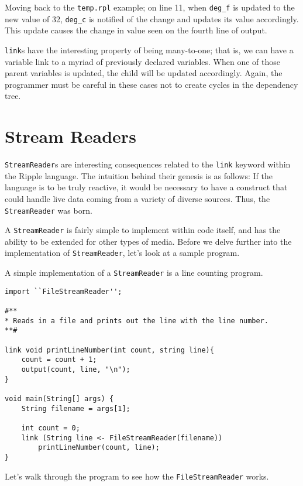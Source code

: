 \documentclass{article}
\newcommand{\code}{\texttt}
\begin{document}
Moving back to the \code{temp.rpl} example; on line 11, when \code{deg\_f} is updated to the new value of 32, \code{deg\_c} is notified of the change and updates its value accordingly. This update causes the change in value seen on the fourth line of output. 

\code{link}s have the interesting property of being many-to-one; that is, we can have a variable link to a myriad of previously declared variables. When one of those parent variables is updated, the child will be updated accordingly. Again, the programmer must be careful in these cases not to create cycles in the dependency tree.

\section{Stream Readers}
\code{StreamReader}s are interesting consequences related to the \code{link} keyword within the Ripple language. The intuition behind their genesis is as follows: If the language is to be truly reactive, it would be necessary to have a construct that could handle live data coming from a variety of diverse sources. Thus, the \code{StreamReader} was born.

A \code{StreamReader} is fairly simple to implement within code itself, and has the ability to be extended for other types of media. Before we delve further into the implementation of \code{StreamReader}, let's look at a sample program.

A simple implementation of a \code{StreamReader} is a line counting program.

\begin{lstlisting}[title=\emph{count.rpl}]
import ``FileStreamReader'';

#**
* Reads in a file and prints out the line with the line number. 
**#

link void printLineNumber(int count, string line){
    count = count + 1;
    output(count, line, "\n");
}

void main(String[] args) {
    String filename = args[1];
    
    int count = 0;
    link (String line <- FileStreamReader(filename)) 
        printLineNumber(count, line);
}
\end{lstlisting}

Let's walk through the program to see how the \code{FileStreamReader} works.
\end{document}
